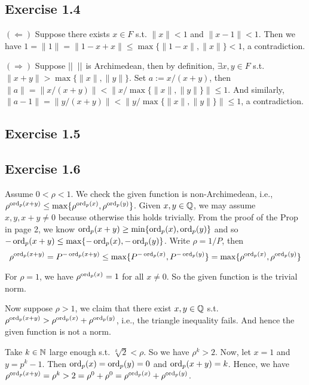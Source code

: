 \documentclass[../Koblitz.tex]{subfiles}
\begin{document}
\subsection*{Exercise 1.4}

$(\Leftarrow)$ Suppose there exists $x\in F$ s.t. $\|x\| < 1$ and $\|x-1\| < 1$. Then we have $1=\|1\|=\|1-x+x\|\leq \max\{\|1-x\|,\|x\|\} < 1$, a contradiction.

$(\Rightarrow)$ Suppose $\dnr$ is Archimedean, then by definition, $\exists x,y\in F$ s.t. $\|x+y\|>\max\{ \|x\|,\|y\|\}$. Set $a:=x/(x+y)$, then $\|a\|=\|x/(x+y)\| < \|x/\max\{ \|x\|,\|y\|\} \| \leq 1$. And similarly, $\|a-1\|=\|y/(x+y)\| < \|y/\max\{ \|x\|,\|y\|\} \| \leq 1$, a contradiction.

\subsection*{Exercise 1.5}

\subsection*{Exercise 1.6}

Assume $0<\rho<1$. We check the given function is non-Archimedean, i.e., $\rho^{\operatorname{ord}_p(x+y)}\leq \max\{\rho^{\operatorname{ord}_p(x)},\rho^{\operatorname{ord}_p(y)}\}$. Given $x,y\in\mathbb{Q}$, we may assume $x,y,x+y\neq0$ because otherwise this holds trivially. From the proof of the Prop in page 2, we know $\operatorname{ord}_p(x+y) \geq \min\{\operatorname{ord}_p(x),\operatorname{ord}_p(y)\}$ and so $-\operatorname{ord}_p(x+y) \leq \max\{-\operatorname{ord}_p(x),-\operatorname{ord}_p(y)\}$. Write $\rho=1/P$, then $$\rho^{\operatorname{ord}_p(x+y)} = P^{-\operatorname{ord}_p(x+y)} \leq \max\{P^{-\operatorname{ord}_p(x)},P^{-\operatorname{ord}_p(y)}\} = \max\{\rho^{\operatorname{ord}_p(x)},\rho^{\operatorname{ord}_p(y)}\}$$

For $\rho=1$, we have $\rho^{\operatorname{ord}_p(x)}=1$ for all $x\neq0$. So the given function is the trivial norm.

Now suppose $\rho>1$, we claim that there exist $x,y\in\mathbb{Q}$ s.t. $\rho^{\operatorname{ord}_p(x+y)} > \rho^{\operatorname{ord}_p(x)}+\rho^{\operatorname{ord}_p(y)}$, i.e., the triangle inequality fails. And hence the given function is not a norm.

Take $k\in\mathbb{N}$ large enough s.t. $\sqrt[k]{2}<\rho$. So we have $\rho^k>2$. Now, let $x=1$ and $y=p^k-1$. Then $\operatorname{ord}_p(x)=\operatorname{ord}_p(y)=0$ and $\operatorname{ord}_p(x+y)=k$. Hence, we have $\rho^{\operatorname{ord}_p(x+y)} = \rho^k >2 = \rho^0 + \rho^0 = \rho^{\operatorname{ord}_p(x)}+\rho^{\operatorname{ord}_p(y)}$.

\begin{comment}
Take $k\in\NN$ large enough s.t. $\sqrt[k]{2}<\rho$. Note that we can take $k$ is even. So we have $\rho^{k+1}>2\rho$. Now let $x=p\cdot(p^{k/2}+1)^{-1}$ and $y=p\cdot(p^{k/2}-1)$. Then $x,y\in\QQ$, and it's easy to check that $\ord_p(x)=\ord_p(y)=1$ and $\ord_p(x+y)=k+1$. So we have $$\rho^{\ord_p(x+y)} = \rho^{k+1} >2\rho = \rho+\rho = \rho^{\ord_p(x)}+\rho^{\ord_p(y)}$$
\end{comment}
\end{document}
